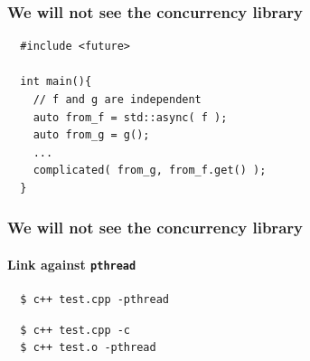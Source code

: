 \begin{frame}[fragile]
  \frametitle{We will not see the concurrency library \frownie }
\begin{lstlisting}
  #include <future>
    
  int main(){
    // f and g are independent
    auto from_f = std::async( f );
    auto from_g = g();
    ...
    complicated( from_g, from_f.get() );
  }
\end{lstlisting}
\end{frame}

\begin{frame}[fragile]
  \frametitle{We will not see the concurrency library \frownie }
  \framesubtitle{Link  against \texttt{pthread}}
\begin{lstlisting}
  $ c++ test.cpp -pthread
\end{lstlisting}
\vfill
\begin{lstlisting}
  $ c++ test.cpp -c
  $ c++ test.o -pthread
\end{lstlisting}

\end{frame}

